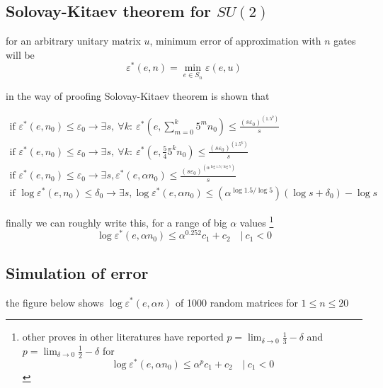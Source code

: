 \documentclass[11pt]{article}
\begin{document}
\subsection{Solovay-Kitaev theorem for $SU(2)$}

for an arbitrary unitary matrix $u$, minimum error of approximation with $n$ gates will be
\[ \varepsilon^*(e, n) = \min_{e \in S_n} \varepsilon(e, u) \]

in the way of proofing Solovay-Kitaev theorem is shown that \cite{ozlos} 

\begin{gather*}
\text{if } \varepsilon^*(e, n_0) \le \varepsilon_0 \rightarrow \exists s, ~ \forall k: ~
\varepsilon^*(e, \sum_{m=0}^k 5^m n_0) \le \frac{(s\varepsilon_0)^{(1.5^k)}}{s} \\
%
\text{if } \varepsilon^*(e, n_0) \le \varepsilon_0 \rightarrow \exists s, ~ \forall k: ~
\varepsilon^*(e, \frac{5}{4} 5^k n_0) \le \frac{(s\varepsilon_0)^{(1.5^k)}}{s} \\
%
\text{if } \varepsilon^*(e, n_0) \le \varepsilon_0 \rightarrow \exists s,
\varepsilon^*(e, \alpha n_0) \le \frac{(s\varepsilon_0)^{(\alpha^{\log 1.5/ \log 5})}}{s} \\
%
\text{if } \log\varepsilon^*(e, n_0) \le \delta_0 \rightarrow \exists s,
\log\varepsilon^*(e, \alpha n_0) \le (\alpha^{\log 1.5/ \log 5}) (\log s + \delta_0) - \log s
\end{gather*}

finally we can roughly write this, for a range of big $\alpha$ values%
%
\footnote{other proves in other literatures \cite{dawson} have reported $p = \lim_{\delta \to 0} \frac{1}{3} - \delta$ and $p = \lim_{\delta \to 0} \frac{1}{2} - \delta$ for
\[ \log\varepsilon^*(e, \alpha n_0) \le \alpha^{p} c_1 + c_2 \quad |~ c_1 < 0 \]
}
%
\begin{equation} \log\varepsilon^*(e, \alpha n_0) \le \alpha^{0.252} c_1 + c_2 \quad |~ c_1 < 0
\end{equation}

\subsection{Simulation of error}

the figure below shows $\log\varepsilon^*(e, \alpha n)$ of 1000 random matrices for $1 \le n \le 20$
\end{document}
